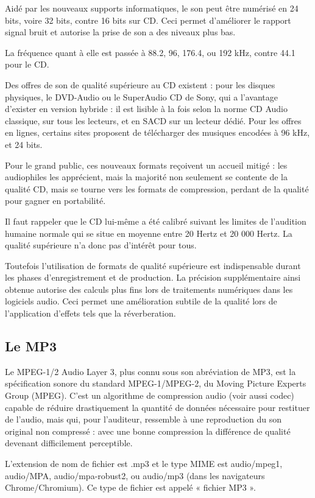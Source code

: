 \documentclass[12pt]{report}
\begin{document}
Aidé par les nouveaux supports informatiques, le son peut être numérisé en 24 bits, voire 32 bits, contre 16 bits sur CD. Ceci permet d'améliorer le rapport signal bruit et autorise la prise de son a des niveaux plus bas.

La fréquence quant à elle est passée à 88.2, 96, 176.4, ou 192 kHz, contre 44.1 pour le CD.

Des offres de son de qualité supérieure au CD existent : pour les disques physiques, le DVD-Audio ou le SuperAudio CD de Sony, qui a l'avantage d'exister en version hybride : il est lisible à la fois selon la norme CD Audio classique, sur tous les lecteurs, et en SACD sur un lecteur dédié. Pour les offres en lignes, certains sites proposent de télécharger des musiques encodées à 96 kHz, et 24 bits.

Pour le grand public, ces nouveaux formats reçoivent un accueil mitigé : les audiophiles les apprécient, mais la majorité non seulement se contente de la qualité CD, mais se tourne vers les formats de compression, perdant de la qualité pour gagner en portabilité.

Il faut rappeler que le CD lui-même a été calibré suivant les limites de l'audition humaine normale qui se situe en moyenne entre 20 Hertz et 20 000 Hertz. La qualité supérieure n'a donc pas d'intérêt pour tous.

Toutefois l'utilisation de formats de qualité supérieure est indispensable durant les phases d'enregistrement et de production. La précision supplémentaire ainsi obtenue autorise des calculs plus fins lors de traitements numériques dans les logiciels audio. Ceci permet une amélioration subtile de la qualité lors de l'application d'effets tels que la réverberation.

\subsection{Le MP3}

Le MPEG-1/2 Audio Layer 3, plus connu sous son abréviation de MP3, est la spécification sonore du standard MPEG-1/MPEG-2, du Moving Picture Experts Group (MPEG). C'est un algorithme de compression audio (voir aussi codec) capable de réduire drastiquement la quantité de données nécessaire pour restituer de l'audio, mais qui, pour l'auditeur, ressemble à une reproduction du son original non compressé : avec une bonne compression la différence de qualité devenant difficilement perceptible.

L'extension de nom de fichier est .mp3 et le type MIME est audio/mpeg1, audio/MPA, audio/mpa-robust2, ou audio/mp3 (dans les navigateurs Chrome/Chromium). Ce type de fichier est appelé « fichier MP3 ».
\end{document}
